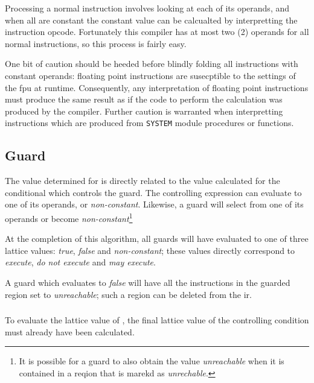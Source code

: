 Processing a normal instruction involves looking at each of its
operands, and when all are constant the constant value can be
calcualted by interpretting the instruction opcode.  Fortunately this
compiler has at most two (2) operands for all normal instructions, so
this process is fairly easy.

One bit of caution should be heeded before blindly folding all
instructions with constant operands: floating point instructions are
susecptible to the settings of the \ac{fpu} at runtime.  Consequently,
any interpretation of floating point instructions must produce the
same result as if the code to perform the calculation was produced by
the compiler.  Further caution is warranted when interpretting
instructions which are produced from \texttt{SYSTEM} module procedures
or functions.

\subsection{Guard}\label{const-prop:classification-of-guard}

The value determined for  is directly
related to the value calculated for the conditional which controls the
guard.  The controlling expression can evaluate to one of its
operands, or \emph{non-constant}.  Likewise, a guard will select from
one of its operands or become \emph{non-constant}\footnote{It is
  possible for a guard to also obtain the value \emph{unreachable}
  when it is contained in a reqion that is marekd as
  \emph{unrechable}.}

At the completion of this algorithm, all guards will have evaluated to
one of three lattice values: \emph{true}, \emph{false} and
\emph{non-constant}; these values directly correspond to
\emph{execute}, \emph{do not execute} and \emph{may execute}.

A guard which evaluates to \emph{false} will have all the instructions
in the guarded region set to \emph{unreachable}; such a region can be
deleted from the \ac{ir}.

\subsubsection{}

To evaluate the lattice value of , the final
lattice value of the controlling condition must already have been
calculated.


